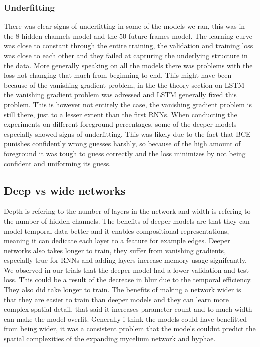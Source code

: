 \documentclass[a4paper,12pt]{article}
\begin{document}
\subsubsection{Underfitting}
There was clear signs of underfitting in some of the models we ran, this was in the $8$ hidden channels model and the $50$ future frames model. The learning curve was close to constant through the entire training, the validation and training loss was close to each other and they failed at capturing the underlying structure in the data.
More generally speaking on all the models there was problems with the loss not changing that much from beginning to end. This might have been because of the vanishing gradient problem, in the the theory section on LSTM the vanishing gradient problem was adressed and LSTM generally fixed this problem. This is however not entirely the case, the vanishing gradient problem is still there, just to a lesser extent than the first RNNs.
When conducting the experiments on different foreground percentages, some of the deeper models especially showed signs of underfitting. This was likely due to the fact that BCE punishes confidently wrong guesses harshly, so because of the high amount of foreground it was tough to guess correctly and the loss minimizes by not being confident and uniforming its guess. 
\subsection{Deep vs wide networks}
Depth is refering to the number of layers in the network and width is refering to the number of hidden channels. The benefits of deeper models are that they can model temporal data better and it enables compositional representations, meaning it can dedicate each layer to a feature for example edges.
Deeper networks also takes longer to train, they suffer from vanishing gradients, especially true for RNNs and adding layers increase memory usage signifcantly. We observed in our trials that the deeper model had a lower validation and test loss. This could be a result of the decrease in blur due to the temporal efficiency. They also did take longer to train.
The benefits of making a network wider is that they are easier to train than deeper models and they can learn more complex spatial detail. that said it increases parameter count and to much width can make the model overfit. 
Generally i think the models could have benefitted from being wider, it was a consistent problem that the models couldnt predict the spatial complexities of the expanding mycelium network and hyphae.
\end{document}
